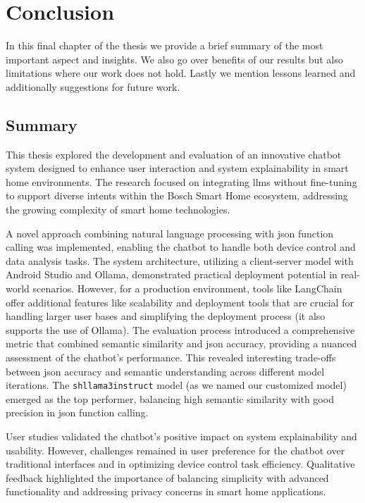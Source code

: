 
\chapter{Conclusion}\label{chap:conclusion}
In this final chapter of the thesis we provide a brief summary of the most important aspect and insights. We also go over benefits of our results but also limitations where our work does not hold. 
Lastly we mention lessons learned and additionally suggestions for future work.

\section{Summary}
This thesis explored the development and evaluation of an innovative chatbot system designed to enhance user interaction and system explainability in smart home environments. The research focused on integrating \glspl{llm} without fine-tuning to support diverse intents within the Bosch Smart Home ecosystem, addressing the growing complexity of smart home technologies.

A novel approach combining natural language processing with \gls{json} function calling was implemented, enabling the chatbot to handle both device control and data analysis tasks. The system architecture, utilizing a client-server model with Android Studio and Ollama, demonstrated practical deployment potential in real-world scenarios. However, for a production environment, tools like LangChain offer additional features like scalability and deployment tools that are crucial for handling larger user bases and simplifying the deployment process (it also supports the use of Ollama).
The evaluation process introduced a comprehensive metric that combined semantic similarity and \gls{json} accuracy, providing a nuanced assessment of the chatbot's performance. This revealed interesting trade-offs between \gls{json} accuracy and semantic understanding across different model iterations. 
The \texttt{shllama3instruct} model (as we named our customized model) emerged as the top performer, balancing high semantic similarity with good precision in \gls{json} function calling.

User studies validated the chatbot's positive impact on system explainability and usability. However, challenges remained in user preference for the chatbot over traditional interfaces and in optimizing device control task efficiency. Qualitative feedback highlighted the importance of balancing simplicity with advanced functionality and addressing privacy concerns in smart home applications.

